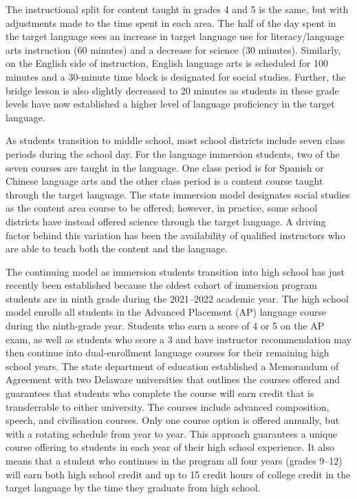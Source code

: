 \documentclass[output=paper,chinesefont]{langscibook}
\begin{document}
The instructional split for content taught in grades 4 and 5 is the same, but with adjustments made to the time spent in each area. The half of the day spent in the target language sees an increase in target language use for literacy\slash language arts instruction (60 minutes) and a decrease for science (30 minutes). Similarly, on the English side of instruction, English language arts is scheduled for 100 minutes and a 30-minute time block is designated for social studies. Further, the bridge lesson is also slightly decreased to 20 minutes as students in these grade levels have now established a higher level of language proficiency in the target language. 

As students transition to middle school, most school districts include seven class periods during the school day. For the language immersion students, two of the seven courses are taught in the language. One class period is for Spanish or Chinese language arts and the other class period is a content course taught through the target language. The state immersion model designates social studies as the content area course to be offered; however, in practice, some school districts have instead offered science through the target language. A driving factor behind this variation has been the availability of qualified instructors who are able to teach both the content and the language. 

The continuing model as immersion students transition into high school has just recently been established because the oldest cohort of immersion program students are in ninth grade during the 2021--2022 academic year. The high school model enrolls all students in the Advanced Placement (AP) language course during the ninth-grade year. Students who earn a score of 4 or 5 on the AP exam, as well as students who score a 3 and have instructor recommendation may then continue into dual-enrollment language courses for their remaining high school years. The state department of education established a Memorandum of Agreement with two Delaware universities that outlines the courses offered and guarantees that students who complete the course will earn credit that is transferrable to either university. The courses include advanced composition, speech, and civilisation courses. Only one course option is offered annually, but with a rotating schedule from year to year. This approach guarantees a unique course offering to students in each year of their high school experience. It also means that a student who continues in the program all four years (grades 9--12) will earn both high school credit and up to 15 credit hours of college credit in the target language by the time they graduate from high school. 
\end{document}
